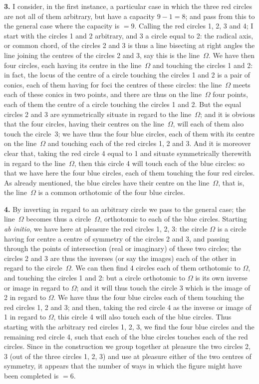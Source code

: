 \documentclass[11pt,a4paper]{book}
\begin{document}
{{{\textbf{3.} I consider, in the first instance, a particular case in which the three red circles are not all of them arbitrary, but have a capacity $9-1=8$; and pass from this to the general case where the capacity is $=9$. Calling the red circles 1, 2, 3 and 4; I start with the circles 1 and 2 arbitrary, and 3 a circle equal to 2: the radical axis, or common chord, of the circles 2 and 3 is thus a line bisecting at right angles the line joining the centres of the circles 2 and 3, say this is the line~$\Omega$. We have then four circles, each having its centre in the line~$\Omega$ and touching the circles 1 and 2: in fact, the locus of the centre of a circle touching the circles 1 and 2 is a pair of conics, each of them having for foci the centres of these circles: the line~$\Omega$ meets each of these conics in two points, and there are thus on the line~$\Omega$ four points, each of them the centre of a circle touching the circles 1 and 2. But the equal circles 2 and 3 are symmetrically situate in regard to the line~$\Omega$; and it is obvious that the four circles, having their centres on the line~$\Omega$, will each of them also touch the circle~3; we have thus the four blue circles, each of them with its centre on the line~$\Omega$ and touching each of the red circles 1, 2 and 3. And it is moreover clear that, taking the red circle 4 equal to 1 and situate symmetrically therewith in regard to the line~$\Omega$, then this circle 4 will touch each of the blue circles: so that we have here the four blue circles, each of them touching the four red circles. As already mentioned, the blue circles have their centre on the line~$\Omega$, that is, the line~$\Omega$ is a common orthotomic of the four blue circles.

\textbf{4.} By inverting in regard to an arbitrary circle we pass to the general case; the line~$\Omega$ becomes thus a circle~$\Omega$, orthotomic to each of the blue circles. Starting \textit{ab initio}, we have here at pleasure the red circles 1, 2, 3: the circle $\Omega$ is a circle having for centre a centre of symmetry of the circles 2 and 3, and passing through the points of intersection (real or imaginary) of these two circles; the circles 2 and 3 are thus the inverses (or say the images) each of the other in regard to the circle~$\Omega$. We can then find 4 circles each of them orthotomic to $\Omega$, and touching the circles 1 and 2: but a circle orthotomic to $\Omega$ is its own inverse or image in regard to $\Omega$; and it will thus touch the circle 3 which is the image of 2 in regard to $\Omega$. We have thus the four blue circles each of them touching the red circles 1, 2 and 3; and then, taking the red circle 4 as the inverse or image of 1 in regard to $\Omega$, this circle 4 will also touch each of the blue circles. Thus starting with the arbitrary red circles 1, 2, 3, we find the four blue circles and the remaining red circle 4, such that each of the blue circles touches each of the red circles. Since in the construction we group together at pleasure the two circles 2, 3 (out of the three circles 1, 2, 3) and use at pleasure either of the two centres of symmetry, it appears that the number of ways in which the figure might have been completed is $=6$.

}}}
\end{document}
